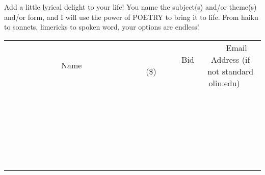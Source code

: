 \documentclass[11pt]{article}
\begin{document}
Add a little lyrical delight to your life! You name the subject(s) and/or theme(s) and/or form, and I will use the power of POETRY to bring it to life. From haiku to sonnets, limericks to spoken word, your options are endless!
\\[6ex]
\begin{tabular}{c c c}
~~~~~~~~~~~~~Name~~~~~~~~~~~~~ & ~~~~~~~~~Bid (\$)~~~~~~~~~  & ~~~Email Address (if not standard olin.edu)~~~\\
 & & \\
\hline
 & & \\
\hline
 & & \\
\hline
 & & \\
\hline
 & & \\
\hline
 & & \\
\hline
 & & \\
\hline
 & & \\
\hline
 & & \\
\hline
 & & \\
\hline
 & & \\
\hline
 & & \\
\hline
 & & \\
\hline
 & & \\
\hline
 & & \\
\hline
 & & \\
\hline
 & & \\
\hline
 & & \\
\hline
 & & \\
\hline
 & & \\
\hline
 & & \\
\hline
 & & \\
\hline
 & & \\
\hline
 & & \\
\hline
 & & \\
\hline
 & & \\
\hline
\end{tabular}
\newpage
\end{document}
